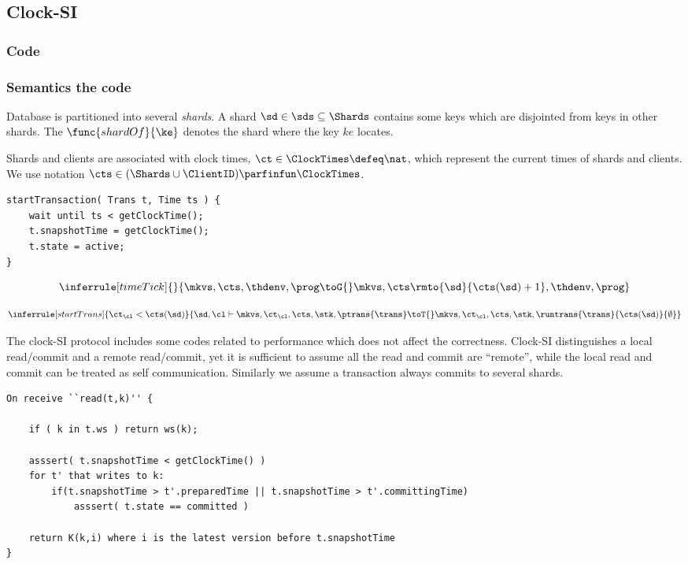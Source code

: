 \subsection{Clock-SI}

\subsubsection{Code}
\renewcommand{\thelstlisting}{\arabic{lstlisting}}


\subsubsection{Semantics the code}

Database is partitioned into several \emph{shards}.
A shard \(\sd \in \sds \subseteq \Shards \)  contains some keys which are disjointed from keys in other shards.
The \( \func{shardOf}{\ke} \) denotes the shard where the key \( ke \) locates.

Shards and clients are associated with clock times, \(  \ct \in \ClockTimes \defeq \nat \), which represent the current times of shards and clients.
We use notation \( \cts \in (\Shards \cup \ClientID ) \parfinfun \ClockTimes\).



\begin{lstlisting}[caption={read},label={lst:simplified-read}]
startTransaction( Trans t, Time ts ) {
    wait until ts < getClockTime();
    t.snapshotTime = getClockTime();
    t.state = active;
}
\end{lstlisting}

\[
    \inferrule[timeTick]{ }{%
        \mkvs, \cts, \thdenv, \prog \toG{}
        \mkvs, \cts\rmto{\sd}{\cts(\sd) + 1}, \thdenv, \prog
    }
\]

\[
    \inferrule[startTrans]{ 
            \ct_\cl < \cts(\sd)
        }{%
            \sd, \cl \vdash \mkvs, \ct_\cl, \cts, \stk, \ptrans{\trans} \toT{}
            \mkvs, \ct_\cl, \cts, \stk, \runtrans{\trans}{\cts(\sd)}{\emptyset}
        }
\]


The clock-SI protocol includes some codes related to performance which does not affect the correctness.
Clock-SI distinguishes a local read/commit and a remote read/commit,
yet it is sufficient to assume all the read and commit are ``remote'',
while the local read and commit can be treated as self communication.
Similarly we assume a transaction always commits to several shards.
\begin{lstlisting}[caption={read},label={lst:simplified-read}]
On receive ``read(t,k)'' {

    if ( k in t.ws ) return ws(k);

    asssert( t.snapshotTime < getClockTime() )
    for t' that writes to k:
        if(t.snapshotTime > t'.preparedTime || t.snapshotTime > t'.committingTime) 
            asssert( t.state == committed )

    return K(k,i) where i is the latest version before t.snapshotTime
}
\end{lstlisting}

